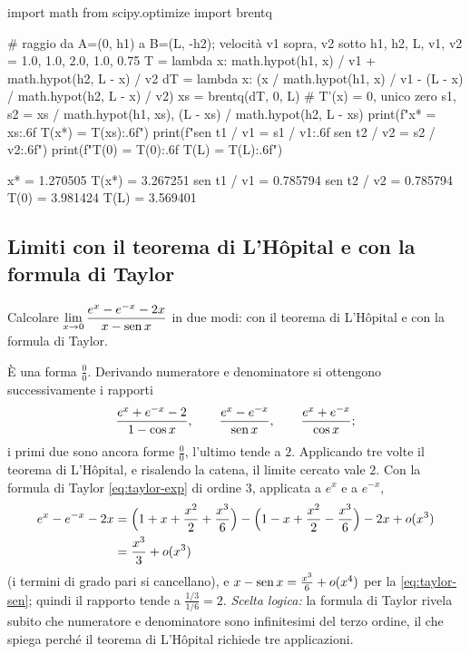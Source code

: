 \begin{python}
import math
from scipy.optimize import brentq

# raggio da A=(0, h1) a B=(L, -h2); velocità v1 sopra, v2 sotto
h1, h2, L, v1, v2 = 1.0, 1.0, 2.0, 1.0, 0.75
T = lambda x: math.hypot(h1, x) / v1 + math.hypot(h2, L - x) / v2
dT = lambda x: (x / math.hypot(h1, x) / v1
                - (L - x) / math.hypot(h2, L - x) / v2)
xs = brentq(dT, 0, L)                    # T'(x) = 0, unico zero
s1, s2 = xs / math.hypot(h1, xs), (L - xs) / math.hypot(h2, L - xs)
print(f"x* = {xs:.6f}   T(x*) = {T(xs):.6f}")
print(f"sen t1 / v1 = {s1 / v1:.6f}   sen t2 / v2 = {s2 / v2:.6f}")
print(f"T(0) = {T(0):.6f}   T(L) = {T(L):.6f}")
\end{python}
\begin{risultato}
x* = 1.270505   T(x*) = 3.267251
sen t1 / v1 = 0.785794   sen t2 / v2 = 0.785794
T(0) = 3.981424   T(L) = 3.569401
\end{risultato}

\subsection*{Limiti con il teorema di L'Hôpital e con la formula di Taylor}

\begin{esercizio}
Calcolare $\displaystyle\lim_{x\to0}\frac{e^{x}-e^{-x}-2x}{x-\operatorname{sen} x}$ in due modi: con il
teorema di L'Hôpital e con la formula di Taylor.
\begin{soluzione}
È una forma $\frac00$. Derivando numeratore e denominatore si ottengono
successivamente i rapporti
\[
  \frac{e^{x}+e^{-x}-2}{1-\cos x}, \qquad \frac{e^{x}-e^{-x}}{\operatorname{sen} x}, \qquad
  \frac{e^{x}+e^{-x}}{\cos x};
\]
i primi due sono ancora forme $\frac00$, l'ultimo tende a $2$. Applicando tre volte il
teorema di L'Hôpital, e risalendo la catena, il limite cercato vale $2$. Con la formula
di Taylor \eqref{eq:taylor-exp} di ordine $3$, applicata a $e^{x}$ e a $e^{-x}$,
\[
\begin{aligned}
  e^{x}-e^{-x}-2x&=\Bigl(1+x+\frac{x^{2}}2+\frac{x^{3}}6\Bigr)
  -\Bigl(1-x+\frac{x^{2}}2-\frac{x^{3}}6\Bigr)-2x+o(x^{3})\\
  &=\frac{x^{3}}3+o(x^{3})
\end{aligned}
\]
(i termini di grado pari si cancellano), e $x-\operatorname{sen} x=\frac{x^{3}}6+o(x^{4})$ per la
\eqref{eq:taylor-sen}; quindi il rapporto tende a $\frac{1/3}{1/6}=2$.
\emph{Scelta logica:} la formula di Taylor rivela subito che numeratore e denominatore
sono infinitesimi del terzo ordine, il che spiega perché il teorema di L'Hôpital
richiede tre applicazioni.
\end{soluzione}
\end{esercizio}


